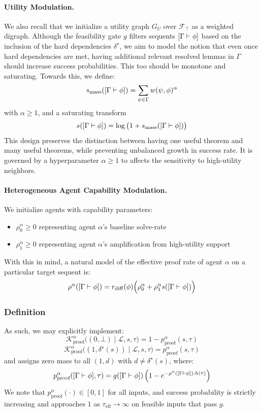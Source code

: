 \paragraph{Utility Modulation.} We also recall that we initialize a utility graph $G_U$ over $\mathcal{F}_\top$ as a weighted digraph. Although the feasibility gate $g$ filters sequents $[\Gamma \vdash \phi]$ based on the inclusion of the hard dependencies $\delta^\star$, we aim to model the notion that even once hard dependencies are met, having additional relevant resolved lemmas in $\Gamma$ should increase success probabilities. This too should be monotone and saturating. Towards this, we define:
\[
s_{\text{mass}}([\Gamma \vdash \phi])=\sum_{\psi\in \Gamma} w(\psi,\phi)^\alpha
\]
with $\alpha\ge 1$, and a saturating transform
\[
s([\Gamma \vdash \phi])=\log\big(1+s_{\text{mass}}([\Gamma \vdash \phi])\big)
\]
This design preserves the distinction between having one useful theorem and many useful theorems, while preventing unbalanced growth in success rate. It is governed by a hyperparameter $\alpha \ge 1$ to affects the sensitivity to high-utility neighbors.

\paragraph{Heterogeneous Agent Capability Modulation.} We initialize agents with capability parameters:
\begin{itemize}
    \item $\rho_0^\alpha\ge 0$ representing agent $\alpha$'s baseline solve-rate
	\item $\rho_1^\alpha\ge 0$ representing agent $\alpha$'s amplification from high-utility support
\end{itemize}
With this in mind, a natural model of the effective proof rate of agent $\alpha$ on a particular target sequent is:
\[
\rho^\alpha([\Gamma \vdash \phi])=r_\mathrm{diff}(\phi)\Big(\rho_0^\alpha + \rho_1^\alpha s([\Gamma \vdash \phi])\Big)
\]

\subsubsection{Definition}

As such, we may explicitly implement:
\[
\mathcal K^\alpha_{\mathrm{proof}}\big((0,\bot)\mid \mathcal{L}, s,\tau\big)=1-p^\alpha_{\mathrm{proof}}(s,\tau)\]
\[\mathcal K^\alpha_{\mathrm{proof}}\big((1,\delta^\star(s))\mid \mathcal{L}, s,\tau\big)=p^\alpha_{\mathrm{proof}}(s,\tau)
\]
and assigns zero mass to all $(1,d)$ with $d\neq \delta^\star(s)$, where:
\[
p_{\text{proof}}^\alpha([\Gamma \vdash \phi],\tau)=g([\Gamma \vdash \phi])\left(1-e^{-\rho^\alpha([\Gamma \vdash \phi])\cdot h(\tau)}\right)
\]
We note that $p_{\text{proof}}^\alpha(\cdot)\in[0,1]$ for all inputs, and success probability is strictly increasing and approaches $1$ as $\tau_{\mathrm{eff}}\to\infty$ on feasible inputs that pass $g$.

